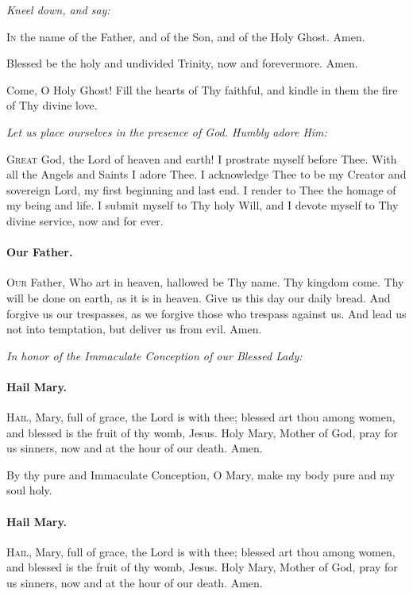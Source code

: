 \documentclass{article}
\begin{document}
\pagebreak
{}

\begin{multicols}{3}

\textit{Kneel down, and say:}

\textsc{In} the name of the Father, and of the Son, and of the Holy Ghost.  Amen.

Blessed be the holy and undivided Trinity, now and forevermore.  Amen.

Come, O Holy Ghost! Fill the hearts of Thy faithful, and kindle in them the fire
of Thy divine love.

\textit{Let us place ourselves in the presence of God.  Humbly adore Him:}

\textsc{Great} God, the Lord of heaven and earth!  I prostrate myself before Thee.
With all the Angels and Saints I adore Thee.  I acknowledge Thee to be my
Creator and sovereign Lord, my first beginning and last end.  I render to Thee
the homage of my being and life.  I submit myself to Thy holy Will, and I devote
myself to Thy divine service, now and for ever.

\paragraph{Our Father.}
\textsc{Our} Father, Who art in heaven, hallowed be Thy name.
Thy kingdom come.  Thy will be done on earth, as it is in heaven.
Give us this day our daily bread.  And forgive us our trespasses,
as we forgive those who trespass against us.  And lead us not
into temptation, but deliver us from evil.  Amen.

\textit{In honor of the Immaculate Conception of our Blessed Lady:}

\paragraph{Hail Mary.}
\textsc{Hail}, Mary, full of grace, the Lord is with thee;
blessed art thou among women, and blessed is the fruit of
thy womb, Jesus.  Holy Mary, Mother of God, pray for us sinners,
now and at the hour of our death. Amen.

By thy pure and Immaculate Conception, O Mary, make my body pure and my soul holy.

\paragraph{Hail Mary.}
\textsc{Hail}, Mary, full of grace, the Lord is with thee;
blessed art thou among women, and blessed is the fruit of
thy womb, Jesus.  Holy Mary, Mother of God, pray for us sinners,
now and at the hour of our death. Amen.


\end{multicols}
\end{document}
